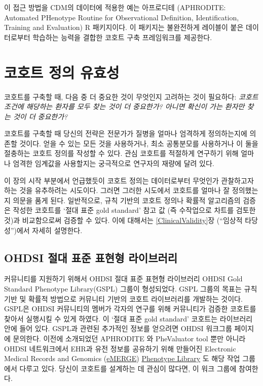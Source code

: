\documentclass[10.5pt]{book}
\theoremstyle{definition}
\theoremstyle{definition}
\theoremstyle{definition}
\theoremstyle{remark}
\begin{document}
이 접근 방법을 CDM의 데이터에 적용한 예는 아프로디테 (APHRODITE:
Automated PHenotype Routine for Observational Definition,
Identification, Training and Evaluation) R 패키지이다. 이 패키지는
불완전하게 레이블이 붙은 데이터로부터 학습하는 능력을 결합한 코호트 구축
프레임워크를 제공한다. \citep{Banda2017APHRODITE} 

\section{코호트 정의 유효성}\label{--}

코호트를 구축할 때, 다음 중 더 중요한 것이 무엇인지 고려하는 것이
필요하다: \emph{코호트 조건에 해당하는 환자를 모두 찾는 것이 더
중요한가? 아니면 확신이 가는 환자만 찾는 것이 더 중요한가?}

코호트를 구축할 때 당신의 전략은 전문가가 질병을 얼마나 엄격하게
정의하는지에 의존할 것이다. 얻을 수 있는 모든 것을 사용하거나, 최소
공통분모를 사용하거나 이 둘을 절충하는 코호트 정의를 작성할 수 있다.
관심 코호트를 적절하게 연구하기 위해 얼마나 엄격한 임계값을 사용할지는
궁극적으로 연구자의 재량에 달려 있다.

이 장의 시작 부분에서 언급했듯이 코호트 정의는 데이터로부터 무엇인가
관찰하고자 하는 것을 유추하려는 시도이다. 그러면 그러한 시도에서
코호트를 얼마나 잘 정의했는지 의문을 품게 된다. 일반적으로, 규칙 기반의
코호트 정의나 확률적 알고리즘의 검증은 작성한 코호트를 `절대 표준 gold
standard' 참고 값 (즉 수작업으로 차트를 검토한 것)과 비교함으로써 검증할
수 있다. 이에 대해서는 \ref{ClinicalValidity}장 (``임상적 타당성'')에서
자세히 설명한다.

\subsection{OHDSI 절대 표준 표현형 라이브러리}\label{ohdsi----}

커뮤니티를 지원하기 위해서 OHDSI 절대 표준 표현형 라이브러리 OHDSI Gold
Standard Phenotype Library(GSPL) 그룹이 형성되었다. GSPL 그룹의 목표는
규칙 기반 및 확률적 방법으로 커뮤니티 기반의 코호트 라이브러리를
개발하는 것이다. GSPL은 OHDSI 커뮤니티의 멤버가 각자의 연구를 위해
커뮤니티가 검증한 코호트를 찾아서 실행시킬 수 있게 하였다. 이 `절대 표준
gold standard' 코호트는 라이브러리 안에 들어 있다. GSPL과 관련된
추가적인 정보를 얻으려면 OHDSI 워크그룹 페이지에 문의한다. 이전에
소개되었던 APHRODITE \citep{Banda2017APHRODITE} 와 PheValuator tool
\citep{Swerdel2019phevaluator} 뿐만 아니라 OHDSI 네트워크에서 EHR과 유전
정보를 공유하기 위해 만들어진 Electronic Medical Records and Genomics
(\href{https://emerge.mc.vanderbilt.edu/}{eMERGE})
\href{https://phekb.org/phenotypes}{Phenotype Library}
\citep{Hripcsak2019eMERGE} 도 해당 작업 그룹에서 다루고 있다. 당신이
코호트를 설계하는 데 관심이 많다면, 이 워크 그룹에 참여한다.
\end{document}
